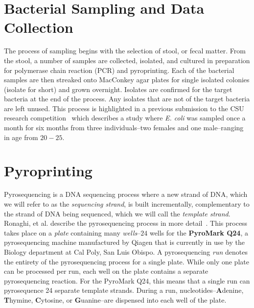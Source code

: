 \documentclass[12pt]{ucthesis}
\begin{document}
   \section{Bacterial Sampling and Data Collection}\label{sec:sampling}
      The process of sampling begins with the selection of stool, or fecal
      matter. From the stool, a number of samples are collected, isolated, and
      cultured in preparation for polymerase chain reaction (PCR) and
      pyroprinting. Each of the bacterial samples are then streaked onto
      MacConkey agar plates for single isolated colonies (isolate for short)
      and grown overnight. Isolates are confirmed for the target bacteria at
      the end of the process. Any isolates that are not of the target bacteria
      are left unused. This process is highlighted in a previous submission to
      the CSU research competition~\cite{Montana:CRC, CSUPERB} which describes
      a study where \textit{E. coli} was sampled once a month for six months
      from three individuals--two females and one male--ranging in age from
      $20-25$.

   \section{Pyroprinting}\label{sec:pyroprinting}
      Pyrosequencing is a DNA sequencing process where a new strand of DNA,
      which we will refer to as the \textit{sequencing strand}, is built
      incrementally, complementary to the strand of DNA being sequenced, which
      we will call the \textit{template strand}. Ronaghi, et al. describe the
      pyrosequencing process in more detail~\cite{ronaghi:shedsLight}. This
      process takes place on a \textit{plate} containing many
      \textit{wells}--$24$ wells for the \textbf{PyroMark Q24}, a
      pyrosequencing machine manufactured by Qiagen that is currently in use by
      the Biology department at Cal Poly, San Luis Obispo. A pyrosequencing
      \textit{run} denotes the entirety of the pyrosequencing process for a
      single plate. While only one plate can be processed per run, each well on
      the plate contains a separate pyrosequencing reaction. For the PyroMark
      Q24, this means that a single run can pyrosequence 24 separate template
      strands. During a run, nucleotides--\textbf{A}denine, \textbf{T}hymine,
      \textbf{C}ytosine, or \textbf{G}uanine--are dispensed into each well of
      the plate.
      
\end{document}
